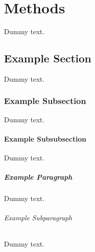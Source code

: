 \chapter{Methods}

Dummy text.

\section{Example Section}

Dummy text.

\subsection{Example Subsection}

Dummy text.

\subsubsection{Example Subsubsection}

Dummy text.

\paragraph{Example Paragraph}

Dummy text.

\subparagraph{Example Subparagraph}

Dummy text.
